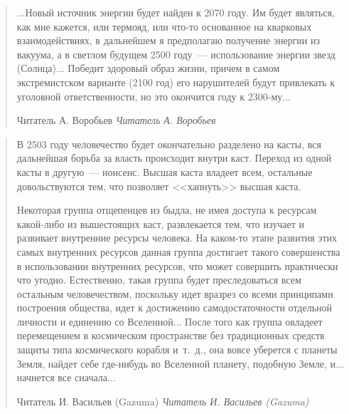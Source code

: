 \documentclass{scrbook}
\makeatletter
\newcommand{\flqq}{<<}
\newcommand{\frqq}{>>}
\newcommand{\mdash}{~--- }
\newcommand{\inlineauthor}[1]{\emph{#1}}
\newcommand{\myquotation}[2][\@empty]{
	\begin{quotation}
	#2

	\ifx\@empty#1
	\else
		\nopagebreak	
		\inlineauthor{#1}
	\fi
	\end{quotation}
}
\makeatother
\begin{document}
\myquotation[Читатель А. Воробьев]{...Новый источник энергии будет найден к 2070 году. Им будет являться, как мне кажется, или термояд, или что-то основанное на кварковых взаимодействиях, в дальнейшем я предполагаю получение энергии из вакуума, а в светлом будущем 2500 году{\mdash}использование энергии звезд (Солнца)... Победит здоровый образ жизни, причем в самом экстремистском варианте (2100 год) его нарушителей будут привлекать к уголовной ответственности, но это окончится году к 2300-му...}

\myquotation[Читатель И. Васильев (Gazuma)]{В 2503 году человечество будет окончательно разделено на касты, вся дальнейшая борьба за власть происходит внутри каст. Переход из одной касты в другую{\mdash}нонсенс. Высшая каста владеет всем, остальные довольствуются тем, что позволяет {\flqq}хапнуть{\frqq} высшая каста.

Некоторая группа отщепенцев из быдла, не имея доступа к ресурсам какой-либо из вышестоящих каст, развлекается тем, что изучает и развивает внутренние ресурсы человека. На каком-то этапе развития этих самых внутренних ресурсов данная группа достигает такого совершенства в использовании внутренних ресурсов, что может совершить практически что угодно. Естественно, такая группа будет преследоваться всем остальным человечеством, поскольку идет вразрез со всеми принципами построения общества, идет к достижению самодостаточности отдельной личности и единению со Вселенной... После того как группа овладеет перемещением в космическом пространстве без традиционных средств защиты типа космического корабля и~т.~д., она вовсе уберется с планеты Земля, найдет себе где-нибудь во Вселенной планету, подобную Земле, и... начнется все сначала...}
\end{document}
